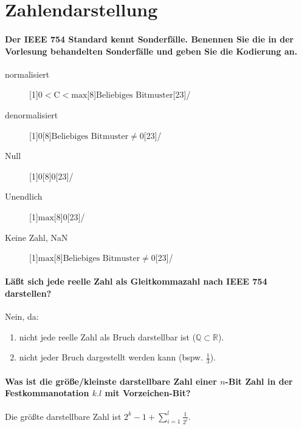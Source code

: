     \section{Zahlendarstellung}
        \paragraph{Der IEEE 754 Standard kennt Sonderfälle. Benennen Sie die in der Vorlesung behandelten Sonderfälle und geben Sie die Kodierung an.}
            \begin{description}
                \item[normalisiert]    \bitpattern[startBit = 31, noBitNumbers]{$ \pm $}[1]{$ 0 < \text{C} < \text{max} $}[8]{$ \text{Beliebiges Bitmuster} $}[23]/
                \item[denormalisiert]  \bitpattern[startBit = 31, noBitNumbers]{$ \pm $}[1]{$ 0 $}[8]{$ \text{Beliebiges Bitmuster} \neq 0 $}[23]/
                \item[Null]            \bitpattern[startBit = 31, noBitNumbers]{$ \pm $}[1]{$ 0 $}[8]{$ 0 $}[23]/
                \item[Unendlich]       \bitpattern[startBit = 31, noBitNumbers]{$ \pm $}[1]{$ \text{max} $}[8]{$ 0 $}[23]/
                \item[Keine Zahl, NaN] \bitpattern[startBit = 31, noBitNumbers]{$ \pm $}[1]{$ \text{max} $}[8]{$ \text{Beliebiges Bitmuster} \neq 0 $}[23]/
            \end{description}

        \paragraph{Läßt sich jede reelle Zahl als Gleitkommazahl nach IEEE 754 darstellen?}
            Nein, da:
            \begin{enumerate}
                \item nicht jede reelle Zahl als Bruch darstellbar ist ($ \mathbb{Q} \subset \mathbb{R} $).
                \item nicht jeder Bruch dargestellt werden kann (bspw. $ \frac{1}{3} $).
            \end{enumerate}

        \paragraph{Was ist die größe/kleinste darstellbare Zahl einer $ n $-Bit Zahl in der Festkommanotation $ k.l $ mit Vorzeichen-Bit?}
            Die größte darstellbare Zahl ist $ 2 ^ k - 1 + \sum _ { i = 1 } ^ { l } \frac{1}{2 ^ i} $.

